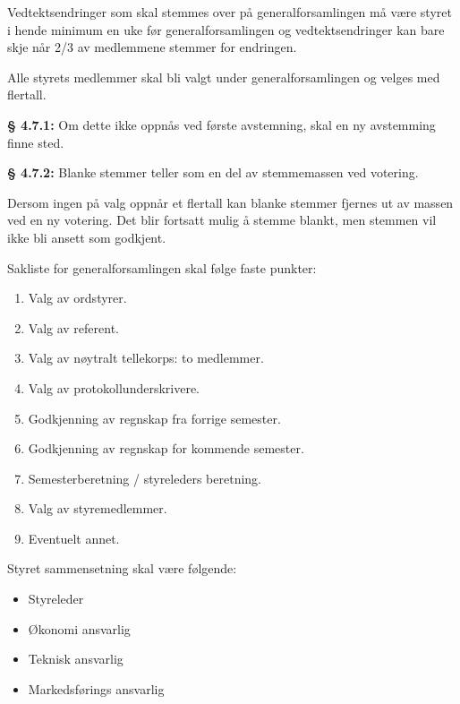 \documentclass{rapport}
\begin{document}
Vedtektsendringer som skal stemmes over på generalforsamlingen må være styret i hende
minimum en uke før generalforsamlingen og vedtektsendringer kan bare skje når 2/3 av
medlemmene stemmer for endringen.

Alle styrets medlemmer skal bli valgt under generalforsamlingen og velges med flertall.

\noindent\textbf{§ 4.7.1:} Om dette ikke oppnås ved første avstemning, skal en ny avstemming
finne sted.

\noindent\textbf{§ 4.7.2:} Blanke stemmer teller som en del av stemmemassen ved votering.

Dersom ingen på valg oppnår et flertall kan blanke stemmer fjernes ut av massen ved
en ny votering. Det blir fortsatt mulig å stemme blankt, men stemmen vil ikke bli ansett
som godkjent.

Sakliste for generalforsamlingen skal følge faste punkter:
\begin{enumerate}[label=\alph*.]
  \item Valg av ordstyrer.
  \item Valg av referent.
  \item Valg av nøytralt tellekorps: to medlemmer.
  \item Valg av protokollunderskrivere.
  \item Godkjenning av regnskap fra forrige semester.
  \item Godkjenning av regnskap for kommende semester.
  \item Semesterberetning / styreleders beretning.
  \item Valg av styremedlemmer.
  \item Eventuelt annet.
\end{enumerate}


Styret sammensetning skal være følgende:
\begin{itemize}
  \item Styreleder
  \item Økonomi ansvarlig
  \item Teknisk ansvarlig
  \item Markedsførings ansvarlig
\end{itemize}
\end{document}
